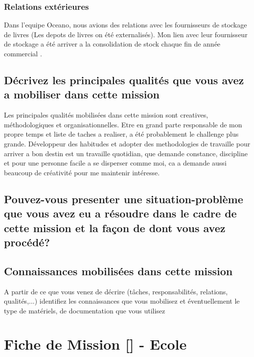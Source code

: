 \documentclass{resume} %
\begin{document}
	\subsubsection{Relations extérieures} 
		Dans l'equipe Oceano, nous avions des relations avec les fournisseurs de stockage de livres (Les depots de livres on été externalisés). Mon lien avec leur fournisseur de stockage a été arriver a la consolidation de stock chaque fin de année commercial .
		
	\subsection{Décrivez les principales qualités que vous avez a mobiliser dans cette mission}
	
		Les principales qualités mobilisées dans cette mission sont creatives, méthodologiques et organisationnelles. 
		Etre en grand parte responsable de mon propre temps et liste de taches a realiser, a été probablement le challenge plus grande. Développeur des habitudes et adopter des methodologies de travaille pour arriver a bon destin est un travaille quotidian, que demande constance, discipline et pour une personne facile a se disperser comme moi, ca a demande aussi beaucoup de créativité pour me maintenir intéresse. 
		
		
		
		
		
		
		
	\subsection{Pouvez-vous presenter une situation-problème que vous avez eu a résoudre dans le cadre de cette mission et la façon de dont vous avez procédé?}
	\subsection {Connaissances mobilisées dans cette mission }
A partir de ce que vous venez de décrire (tâches, responsabilités, relations, qualités,...) identifiez les connaissances que vous mobilisez et éventuellement le type de matériels, de documentation que vous utilisez





\section{Fiche de Mission [] - Ecole }
\end{document}
